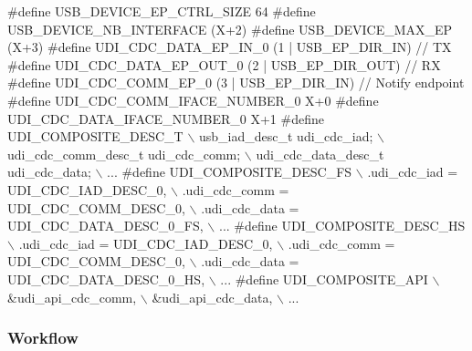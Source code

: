 \begin{DoxyCode}
\textcolor{preprocessor}{         #define USB\_DEVICE\_EP\_CTRL\_SIZE  64}
\textcolor{preprocessor}{}\textcolor{preprocessor}{         #define USB\_DEVICE\_NB\_INTERFACE (X+2)}
\textcolor{preprocessor}{}\textcolor{preprocessor}{         #define USB\_DEVICE\_MAX\_EP (X+3)}
\textcolor{preprocessor}{}
\textcolor{preprocessor}{         #define  UDI\_CDC\_DATA\_EP\_IN\_0          (1 | USB\_EP\_DIR\_IN)  // TX}
\textcolor{preprocessor}{}\textcolor{preprocessor}{         #define  UDI\_CDC\_DATA\_EP\_OUT\_0         (2 | USB\_EP\_DIR\_OUT) // RX}
\textcolor{preprocessor}{}\textcolor{preprocessor}{         #define  UDI\_CDC\_COMM\_EP\_0             (3 | USB\_EP\_DIR\_IN)  // Notify
       endpoint}
\textcolor{preprocessor}{}\textcolor{preprocessor}{         #define  UDI\_CDC\_COMM\_IFACE\_NUMBER\_0   X+0}
\textcolor{preprocessor}{}\textcolor{preprocessor}{         #define  UDI\_CDC\_DATA\_IFACE\_NUMBER\_0   X+1}
\textcolor{preprocessor}{}
\textcolor{preprocessor}{         #define UDI\_COMPOSITE\_DESC\_T \(\backslash\)}
\textcolor{preprocessor}{            usb\_iad\_desc\_t udi\_cdc\_iad; \(\backslash\)}
\textcolor{preprocessor}{            udi\_cdc\_comm\_desc\_t udi\_cdc\_comm; \(\backslash\)}
\textcolor{preprocessor}{            udi\_cdc\_data\_desc\_t udi\_cdc\_data; \(\backslash\)}
\textcolor{preprocessor}{            ...}
\textcolor{preprocessor}{}\textcolor{preprocessor}{         #define UDI\_COMPOSITE\_DESC\_FS \(\backslash\)}
\textcolor{preprocessor}{            .udi\_cdc\_iad               = UDI\_CDC\_IAD\_DESC\_0, \(\backslash\)}
\textcolor{preprocessor}{            .udi\_cdc\_comm              = UDI\_CDC\_COMM\_DESC\_0, \(\backslash\)}
\textcolor{preprocessor}{            .udi\_cdc\_data              = UDI\_CDC\_DATA\_DESC\_0\_FS, \(\backslash\)}
\textcolor{preprocessor}{            ...}
\textcolor{preprocessor}{}\textcolor{preprocessor}{         #define UDI\_COMPOSITE\_DESC\_HS \(\backslash\)}
\textcolor{preprocessor}{            .udi\_cdc\_iad               = UDI\_CDC\_IAD\_DESC\_0, \(\backslash\)}
\textcolor{preprocessor}{            .udi\_cdc\_comm              = UDI\_CDC\_COMM\_DESC\_0, \(\backslash\)}
\textcolor{preprocessor}{            .udi\_cdc\_data              = UDI\_CDC\_DATA\_DESC\_0\_HS, \(\backslash\)}
\textcolor{preprocessor}{            ...}
\textcolor{preprocessor}{}\textcolor{preprocessor}{         #define UDI\_COMPOSITE\_API \(\backslash\)}
\textcolor{preprocessor}{            &udi\_api\_cdc\_comm,       \(\backslash\)}
\textcolor{preprocessor}{            &udi\_api\_cdc\_data,       \(\backslash\)}
\textcolor{preprocessor}{            ...}
\end{DoxyCode}
\hypertarget{udi_cdc_use_case_composite_udi_cdc_use_case_composite_usage_flow}{}\subsubsection{Workflow}\label{udi_cdc_use_case_composite_udi_cdc_use_case_composite_usage_flow}

